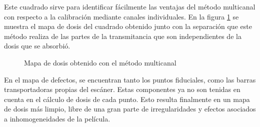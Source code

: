 Este cuadrado sirve para identificar fácilmente las ventajas del método multicanal con respecto a la calibración mediante canales individuales. En la figura \ref{fig:MapaCuadrado} se muestra el mapa de dosis del cuadrado obtenido junto con la separación que este método realiza de las partes de la transmitancia que son independientes de la dosis que se absorbió.\\
\begin{figure}[H]
	\centering
	\hfill
	\caption{Mapa de dosis obtenido con el método multicanal}
	\label{fig:MapaCuadrado}
\end{figure}

En el mapa de defectos, se encuentran tanto los puntos fiduciales, como las barras transportadoras propias del escáner. Estas componentes ya no son tenidas en cuenta en el cálculo de dosis de cada punto. Esto resulta finalmente en un mapa de dosis más limpio, libre de una gran parte de irregularidades y efectos asociados a inhomogeneidades de la película.\\

